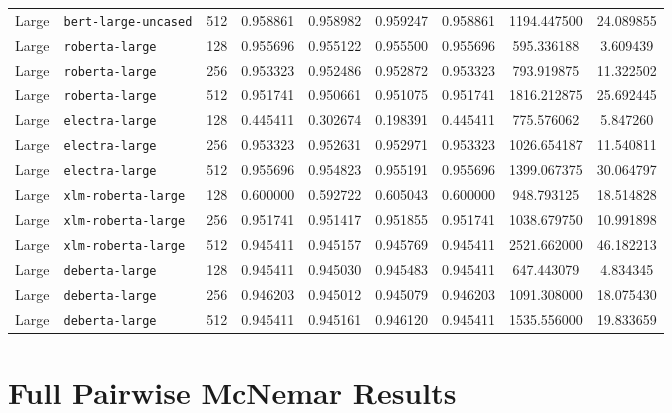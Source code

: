 \documentclass[11pt]{article}
\begin{document}
\begin{landscape}
\begin{longtable}{llccccccc}
Large & \texttt{bert-large-uncased} & 512 & 0.958861 & 0.958982 & 0.959247 & 0.958861 & 1194.447500 & 24.089855 \\
Large & \texttt{roberta-large} & 128 & 0.955696 & 0.955122 & 0.955500 & 0.955696 & 595.336188 & 3.609439 \\
Large & \texttt{roberta-large} & 256 & 0.953323 & 0.952486 & 0.952872 & 0.953323 & 793.919875 & 11.322502 \\
Large & \texttt{roberta-large} & 512 & 0.951741 & 0.950661 & 0.951075 & 0.951741 & 1816.212875 & 25.692445 \\
Large & \texttt{electra-large} & 128 & 0.445411 & 0.302674 & 0.198391 & 0.445411 & 775.576062 & 5.847260 \\
Large & \texttt{electra-large} & 256 & 0.953323 & 0.952631 & 0.952971 & 0.953323 & 1026.654187 & 11.540811 \\
Large & \texttt{electra-large} & 512 & 0.955696 & 0.954823 & 0.955191 & 0.955696 & 1399.067375 & 30.064797 \\
Large & \texttt{xlm-roberta-large} & 128 & 0.600000 & 0.592722 & 0.605043 & 0.600000 & 948.793125 & 18.514828 \\
Large & \texttt{xlm-roberta-large} & 256 & 0.951741 & 0.951417 & 0.951855 & 0.951741 & 1038.679750 & 10.991898 \\
Large & \texttt{xlm-roberta-large} & 512 & 0.945411 & 0.945157 & 0.945769 & 0.945411 & 2521.662000 & 46.182213 \\
Large & \texttt{deberta-large} & 128 & 0.945411 & 0.945030 & 0.945483 & 0.945411 & 647.443079 & 4.834345 \\
Large & \texttt{deberta-large} & 256 & 0.946203 & 0.945012 & 0.945079 & 0.946203 & 1091.308000 & 18.075430 \\
Large & \texttt{deberta-large} & 512 & 0.945411 & 0.945161 & 0.946120 & 0.945411 & 1535.556000 & 19.833659 \\
\bottomrule
\end{longtable}
\end{landscape}

\section{Full Pairwise McNemar Results}
\label{app:mcnemar}
\end{document}
